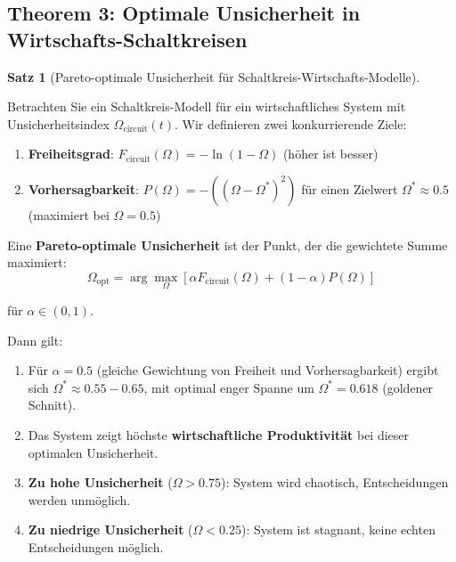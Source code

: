 \documentclass[a4paper,12pt,twoside]{report}
\theoremstyle{definition}
\newtheorem{satz}{Satz}
\begin{document}
\subsection*{Theorem 3: Optimale Unsicherheit in Wirtschafts-Schaltkreisen}

\begin{satz}[Pareto-optimale Unsicherheit für Schaltkreis-Wirtschafts-Modelle]
\label{satz:optimal_unsicherheit_circuit}

Betrachten Sie ein Schaltkreis-Modell für ein wirtschaftliches System mit Unsicherheitsindex $\Omega_{\text{circuit}}(t)$. Wir definieren zwei konkurrierende Ziele:

\begin{enumerate}
    \item \textbf{Freiheitsgrad}: $F_{\text{circuit}}(\Omega) = -\ln(1-\Omega)$ (höher ist besser)
    \item \textbf{Vorhersagbarkeit}: $P(\Omega) = -((\Omega - \Omega^*)^2)$ für einen Zielwert $\Omega^* \approx 0.5$ (maximiert bei $\Omega = 0.5$)
\end{enumerate}

Eine \textbf{Pareto-optimale Unsicherheit} ist der Punkt, der die gewichtete Summe maximiert:
\begin{equation}
\Omega_{\text{opt}} = \arg\max_{\Omega} \left[ \alpha F_{\text{circuit}}(\Omega) + (1-\alpha) P(\Omega) \right]
\end{equation}

für $\alpha \in (0,1)$.

Dann gilt:

\begin{enumerate}
    \item Für $\alpha = 0.5$ (gleiche Gewichtung von Freiheit und Vorhersagbarkeit) ergibt sich $\Omega^* \approx 0.55 - 0.65$, mit optimal enger Spanne um $\Omega^* = 0.618$ (goldener Schnitt).
    
    \item Das System zeigt höchste \textbf{wirtschaftliche Produktivität} bei dieser optimalen Unsicherheit.
    
    \item \textbf{Zu hohe Unsicherheit} ($\Omega > 0.75$): System wird chaotisch, Entscheidungen werden unmöglich.
    
    \item \textbf{Zu niedrige Unsicherheit} ($\Omega < 0.25$): System ist stagnant, keine echten Entscheidungen möglich.
\end{enumerate}

\end{satz}
\end{document}
